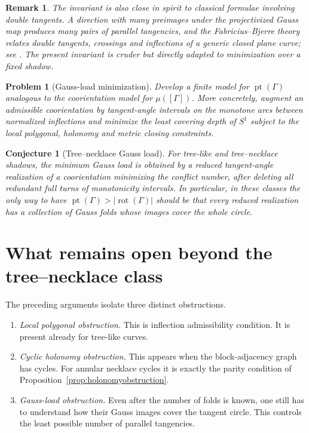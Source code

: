 \documentclass[11pt]{article}
\newtheorem{problem}[theorem]{Problem}
\newtheorem{conjecture}[theorem]{Conjecture}
\newtheorem{remark}[theorem]{Remark}
\newcommand{\rot}{\operatorname{rot}}
\newcommand{\parnum}{\operatorname{pt}}
\begin{document}
\begin{remark}
The invariant is also close in spirit to classical formulae involving double tangents.  A direction with many preimages under the projectivized Gauss map produces many pairs of parallel tangencies, and the Fabricius--Bjerre theory relates double tangents, crossings and inflections of a generic closed plane curve; see \cite{FabriciusBjerre,Thompson}.  The present invariant is cruder but directly adapted to minimization over a fixed shadow.
\end{remark}

\begin{problem}[Gauss-load minimization]\label{prob:gaussload}
Develop a finite model for $\parnum(\Gamma)$ analogous to the coorientation model for $\mu([\Gamma])$.  More concretely, augment an admissible coorientation by tangent-angle intervals on the monotone arcs between normalized inflections and minimize the least covering depth of $S^1$ subject to the local polygonal, holonomy and metric closing constraints.
\end{problem}

\begin{conjecture}[Tree--necklace Gauss load]\label{conj:necklacegauss}
For tree-like and tree--necklace shadows, the minimum Gauss load is obtained by a reduced tangent-angle realization of a coorientation minimizing the conflict number, after deleting all redundant full turns of monotonicity intervals.  In particular, in these classes the only way to have $\parnum(\Gamma)>|\rot(\Gamma)|$ should be that every reduced realization has a collection of Gauss folds whose images cover the whole circle.
\end{conjecture}


\section{What remains open beyond the tree--necklace class}

The preceding arguments isolate three distinct obstructions.

\begin{enumerate}[label=(\roman*)]
\item \emph{Local polygonal obstruction.}  This is inflection admissibility condition.  It is present already for tree-like curves.
\item \emph{Cyclic holonomy obstruction.}  This appears when the block-adjacency graph has cycles.  For annular necklace cycles it is exactly the parity condition of Proposition~\ref{prop:holonomyobstruction}.
\item \emph{Gauss-load obstruction.}  Even after the number of folds is known, one still has to understand how their Gauss images cover the tangent circle.  This controls the least possible number of parallel tangencies.
\end{enumerate}
\end{document}
